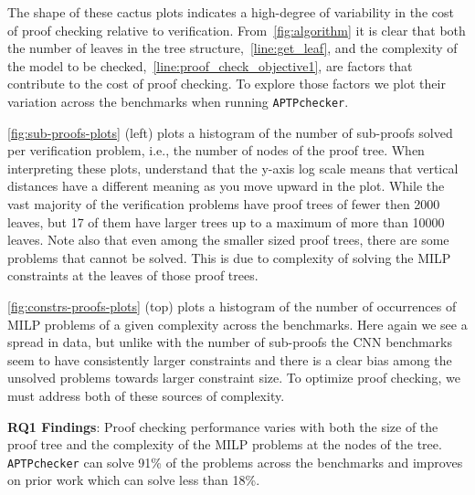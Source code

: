 \documentclass[oneside,11pt,dvipsnames]{book}
\newcommand{\nnproofchecker}{\texttt{APTPchecker}}
\newcommand{\mycomment}[3][\color{blue}]{{#1{{#2}: {#3}}}}
\newcommand{\tvn}[1]{\mycomment{TVN}{#1}}{}
\begin{document}
The shape of these cactus plots indicates a high-degree of variability in the cost of proof
checking relative to verification.
From~\autoref{fig:algorithm} it is clear that both the number of leaves in the tree
structure,~\autoref{line:get_leaf}, and the complexity of the model to be checked,~\autoref{line:proof_check_objective1}, are factors that contribute to the cost of proof checking.
To explore those factors we plot their variation across the benchmarks when running \nnproofchecker{}.

\autoref{fig:sub-proofs-plots} (left) plots a histogram of the number of sub-proofs solved per verification 
problem, i.e., the number of nodes of the proof tree.
When interpreting these plots, understand that the y-axis log scale means that vertical
distances have a different meaning as you move upward in the plot.
While the vast majority of the verification problems have proof trees of fewer then 2000 leaves, but 17 of them have larger trees up to a maximum of more than 10000 leaves.
Note also that even among the smaller sized proof trees, there are some problems that cannot be solved.
This is due to complexity of solving the MILP constraints at the leaves of those proof trees.

\autoref{fig:constrs-proofs-plots} (top) plots a histogram of the number of occurrences of MILP problems of
a given complexity across the benchmarks.  Here again we see a spread in data, but unlike with the number of sub-proofs the CNN benchmarks seem to have consistently larger constraints and there is a clear bias among the unsolved problems towards larger constraint size.
To optimize proof checking, we must address both of these sources of complexity.

\begin{tcolorbox}[left=1pt,right=1pt,top=1pt,bottom=1pt]
\textbf{RQ1 Findings}: Proof checking performance varies with both the size of the proof tree and the complexity of the MILP problems at the nodes of the tree.  \nnproofchecker{} can solve 91\% of the problems across the benchmarks and improves on prior work which can solve less than 18\%.
\end{tcolorbox}
\end{document}
